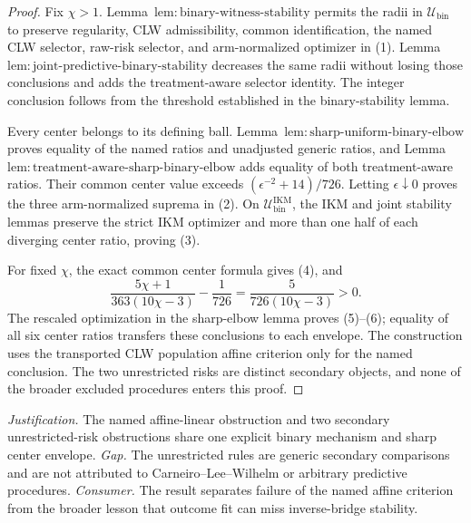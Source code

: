 \documentclass{article}
\begin{document}
\begin{proof}
Fix \(\chi>1\).  Lemma~\(\mathrm{lem{:}binary\text{-}witness\text{-}stability}\) permits the radii in \(\mathcal U_{\mathrm{bin}}\) to preserve regularity, CLW admissibility, common identification, the named CLW selector, raw-risk selector, and arm-normalized optimizer in (1).  Lemma~\(\mathrm{lem{:}joint\text{-}predictive\text{-}binary\text{-}stability}\) decreases the same radii without losing those conclusions and adds the treatment-aware selector identity.  The integer conclusion follows from the threshold established in the binary-stability lemma.

Every center belongs to its defining ball.  Lemma~\(\mathrm{lem{:}sharp\text{-}uniform\text{-}binary\text{-}elbow}\) proves equality of the named ratios and unadjusted generic ratios, and Lemma~\(\mathrm{lem{:}treatment\text{-}aware\text{-}sharp\text{-}binary\text{-}elbow}\) adds equality of both treatment-aware ratios.  Their common center value exceeds \((\epsilon^{-2}+14)/726\).  Letting \(\epsilon\downarrow0\) proves the three arm-normalized suprema in (2).  On \(\mathcal U_{\mathrm{bin}}^{\mathrm{IKM}}\), the IKM and joint stability lemmas preserve the strict IKM optimizer and more than one half of each diverging center ratio, proving (3).

For fixed \(\chi\), the exact common center formula gives (4), and
\[
 \frac{5\chi+1}{363(10\chi-3)}-\frac1{726}
 =\frac5{726(10\chi-3)}>0.                                \tag{44}
\]
The rescaled optimization in the sharp-elbow lemma proves (5)--(6); equality of all six center ratios transfers these conclusions to each envelope.  The construction uses the transported CLW population affine criterion only for the named conclusion.  The two unrestricted risks are distinct secondary objects, and none of the broader excluded procedures enters this proof.
\end{proof}
\par\smallskip\noindent \textit{Justification.} The named affine-linear obstruction and two secondary unrestricted-risk obstructions share one explicit binary mechanism and sharp center envelope. \textit{Gap.} The unrestricted rules are generic secondary comparisons and are not attributed to Carneiro--Lee--Wilhelm or arbitrary predictive procedures. \textit{Consumer.} The result separates failure of the named affine criterion from the broader lesson that outcome fit can miss inverse-bridge stability.
\end{document}
